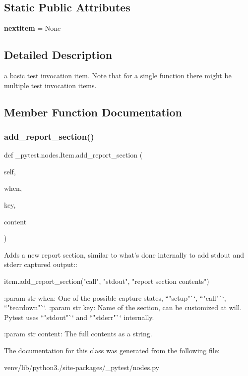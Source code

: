 \subsection*{Static Public Attributes}
\begin{DoxyCompactItemize}
\item 
\mbox{\label{class__pytest_1_1nodes_1_1_item_a328f0ad97df9237daa9ef4ca6b0b7319}} 
{\bfseries nextitem} = None
\end{DoxyCompactItemize}


\subsection{Detailed Description}
\begin{DoxyVerb}a basic test invocation item. Note that for a single function
there might be multiple test invocation items.
\end{DoxyVerb}
 

\subsection{Member Function Documentation}
\mbox{\label{class__pytest_1_1nodes_1_1_item_a0e615159d77a322c8ac4c69bd1b443dc}} 
\subsubsection{\texorpdfstring{add\+\_\+report\+\_\+section()}{add\_report\_section()}}
{\footnotesize\ttfamily def \+\_\+pytest.\+nodes.\+Item.\+add\+\_\+report\+\_\+section (\begin{DoxyParamCaption}\item[{}]{self,  }\item[{}]{when,  }\item[{}]{key,  }\item[{}]{content }\end{DoxyParamCaption})}

\begin{DoxyVerb}Adds a new report section, similar to what's done internally to add stdout and
stderr captured output::

    item.add_report_section("call", "stdout", "report section contents")

:param str when:
    One of the possible capture states, ``"setup"``, ``"call"``, ``"teardown"``.
:param str key:
    Name of the section, can be customized at will. Pytest uses ``"stdout"`` and
    ``"stderr"`` internally.

:param str content:
    The full contents as a string.
\end{DoxyVerb}
 

The documentation for this class was generated from the following file\+:\begin{DoxyCompactItemize}
\item 
venv/lib/python3./site-\/packages/\+\_\+pytest/nodes.\+py\end{DoxyCompactItemize}
